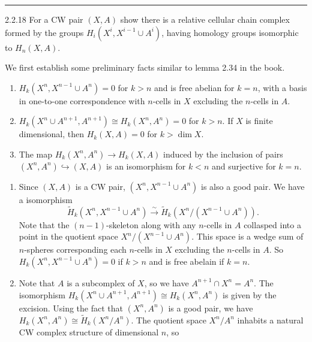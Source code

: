 \documentclass[a4paper, 12pt]{article}
\begin{document}
\noindent\rule{7in}{2.8pt}
\begin{problem}{2.2.18}
For a CW pair \((X,A)\) show there is a relative cellular chain complex formed by the groups \(H_i(X^i,X^{i-1}\cup A^i)\), having homology groups isomorphic to \(H_n(X,A)\).
\end{problem}
\begin{solution}
We first establish some preliminary facts similar to lemma 2.34 in the book.
\begin{claim}
\begin{enumerate}[(1)]
\item \(H_k(X^n,X^{n-1}\cup A^n)=0\) for \(k>n\) and is free abelian for \(k=n\), with a basis in one-to-one correspondence with \(n\)-cells in \(X\) excluding the \(n\)-cells in \(A\). 
\item \(H_k(X^n\cup A^{n+1},A^{n+1})\cong H_k(X^n,A^n)=0\) for \(k>n\). If \(X\) is finite dimensional, then \(H_k(X,A)=0\) for \(k>\dim X\).
\item The map \(H_k(X^n,A^n)\rightarrow H_k(X,A)\) induced by the inclusion of pairs \((X^n,A^n)\hookrightarrow (X,A)\) is an isomorphism for \(k<n\) and surjective for \(k=n\).
\end{enumerate}
\end{claim}
\begin{claimproof}
\begin{enumerate}[(1)]
\item Since \((X,A)\) is a CW pair, \((X^n,X^{n-1}\cup A^n)\) is also a good pair. We have a isomorphism 
\[\tilde{H}_k(X^n,X^{n-1}\cup A^n)\xrightarrow{\sim} \tilde{H}_k(X^n/(X^{n-1}\cup A^n)).\]
Note that the \((n-1)\)-skeleton along with any \(n\)-cells in \(A\) collasped into a point in the quotient space \(X^n/(X^{n-1}\cup A^n)\). This space is a wedge sum of \(n\)-spheres corresponding each 
\(n\)-cells in \(X\) excluding the \(n\)-cells in \(A\). So \(H_k(X^n,X^{n-1}\cup A^n)=0\) if \(k>n\) and is free abelain if \(k=n\).
\item Note that \(A\) is a subcomplex of \(X\), so we have \(A^{n+1}\cap X^n=A^n\). The isomorphism \(H_k(X^n\cup A^{n+1},A^{n+1})\cong H_k(X^n,A^n)\) is given by the excision. Using the fact that \((X^n,A^n)\) is a good pair, 
we have \(H_k(X^n,A^n)\cong \tilde{H}_k(X^n/A^n)\). The quotient space \(X^n/A^n\) inhabits a natural CW complex structure of dimensional \(n\), so 

\end{enumerate}
\end{claimproof}
\end{solution}
\end{document}
